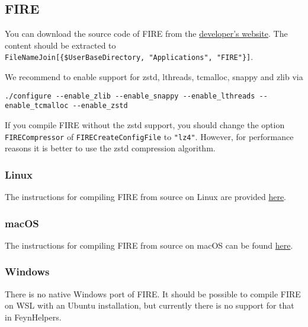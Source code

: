 \documentclass[../FeynHelpersManual.tex]{subfiles}
\begin{document}
\hypertarget{fire}{%
\subsection{FIRE}\label{fire}}

You can download the source code of FIRE from the
\href{https://bitbucket.org/feynmanIntegrals/fire}{developer's website}.
The content should be extracted to
\texttt{FileNameJoin[\allowbreak{}\{\allowbreak{}\$UserBaseDirectory,\ \allowbreak{}"Applications",\ \allowbreak{}"FIRE"\}]}.

We recommend to enable support for zstd, lthreads, tcmalloc, snappy and
zlib via

\begin{verbatim}
./configure --enable_zlib --enable_snappy --enable_lthreads --enable_tcmalloc --enable_zstd
\end{verbatim}

If you compile FIRE without the zstd support, you should change the
option \texttt{FIRECompressor} of \texttt{FIRECreateConfigFile} to
\texttt{"lz4"}. However, for performance reasons it is better to use the
zstd compression algorithm.

\hypertarget{linux-1}{%
\subsubsection{Linux}\label{linux-1}}

The instructions for compiling FIRE from source on Linux are provided
\href{https://bitbucket.org/feynmanIntegrals/fire/src/master/}{here}.

\hypertarget{macos-1}{%
\subsubsection{macOS}\label{macos-1}}

The instructions for compiling FIRE from source on macOS can be found
\href{https://bitbucket.org/feynmanIntegrals/fire/issues/10/issue-of-the-installation-on-macos}{here}.

\hypertarget{windows-1}{%
\subsubsection{Windows}\label{windows-1}}

There is no native Windows port of FIRE. It should be possible to
compile FIRE on WSL with an Ubuntu installation, but currently there is
no support for that in FeynHelpers.
\end{document}
